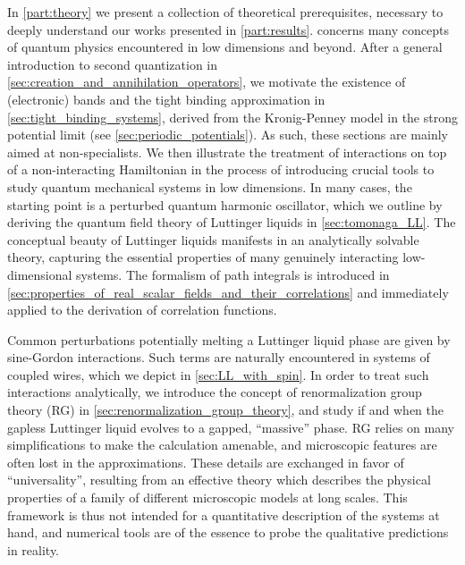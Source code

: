 In \cref{part:theory} we present a collection of theoretical prerequisites, necessary to deeply understand our works presented in \cref{part:results}.
 concerns many concepts of quantum physics encountered in low dimensions and beyond.
After a general introduction to second quantization in \cref{sec:creation_and_annihilation_operators}, we motivate the existence of (electronic) bands and the tight binding approximation in \cref{sec:tight_binding_systems}, derived from the Kronig-Penney model in the strong potential limit (see \cref{sec:periodic_potentials}).
As such, these sections are mainly aimed at non-specialists.
We then illustrate the treatment of interactions on top of a non-interacting Hamiltonian in the process of introducing crucial tools to study quantum mechanical systems in low dimensions.
In many cases, the starting point is a perturbed quantum harmonic oscillator, which we outline by deriving the quantum field theory of Luttinger liquids in \cref{sec:tomonaga_LL}.
The conceptual beauty of Luttinger liquids manifests in an analytically solvable theory, capturing the essential properties of many genuinely interacting low-dimensional systems.
The formalism of path integrals is introduced in \cref{sec:properties_of_real_scalar_fields_and_their_correlations} and immediately applied to the derivation of correlation functions.

Common perturbations potentially melting a Luttinger liquid phase are given by sine-Gordon interactions.
Such terms are naturally encountered in systems of coupled wires, which we depict in \cref{sec:LL_with_spin}.
In order to treat such interactions analytically, we introduce the concept of renormalization group theory (RG) in \cref{sec:renormalization_group_theory}, and study if and when the gapless Luttinger liquid evolves to a gapped, ``massive'' phase.
RG relies on many simplifications to make the calculation amenable, and microscopic features are often lost in the approximations.
These details are exchanged in favor of ``universality'', resulting from an effective theory which describes the physical properties of a family of different microscopic models at long scales.
This framework is thus not intended for a quantitative description of the systems at hand, and numerical tools are of the essence to probe the qualitative predictions in reality.

